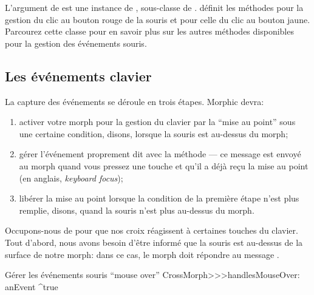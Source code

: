 \documentclass[a4paper,10pt,twoside]{book}
\begin{document}
L'argument  de  est une instance de
\mbox{,} sous-classe de .
 d\'efinit les m\'ethodes
 pour la gestion du clic au
bouton rouge de la souris et 
pour celle du clic au bouton jaune. Parcourez cette classe pour
en savoir plus sur les autres m\'ethodes disponibles pour la gestion
des \'ev\'enements souris.

\subsection{Les \'ev\'enements clavier}

La capture des événements  se d\'eroule en trois
\'etapes. Morphic devra:


\begin{enumerate}
	\item activer votre morph pour la gestion du clavier par la ``mise
      au point'' sous une certaine condition, disons, lorsque la souris est au-dessus du morph; 
	\item g\'erer l'\'ev\'enement proprement dit avec la m\'ethode
       --- ce message est envoy\'e au
      morph quand vous pressez une touche et qu'il a d\'ej\`a re\c{c}u
      la mise au point  (en anglais, \emph{keyboard focus});
	\item lib\'erer la mise au point lorsque la condition de la
      premi\`ere \'etape n'est plus remplie, disons, quand la souris
      n'est plus au-dessus du morph.
\end{enumerate}

Occupons-nous de  pour que nos croix r\'eagissent \`a
certaines touches du clavier. Tout d'abord, nous avons besoin d'\^etre
inform\'e que la souris est au-dessus de la surface de notre morph:
dans ce cas, le morph doit r\'epondre  au message
.


\begin{method}{G\'erer les \'ev\'enements souris ``mouse over''} 
CrossMorph>>>handlesMouseOver: anEvent
	^true
\end{method}
\end{document}
